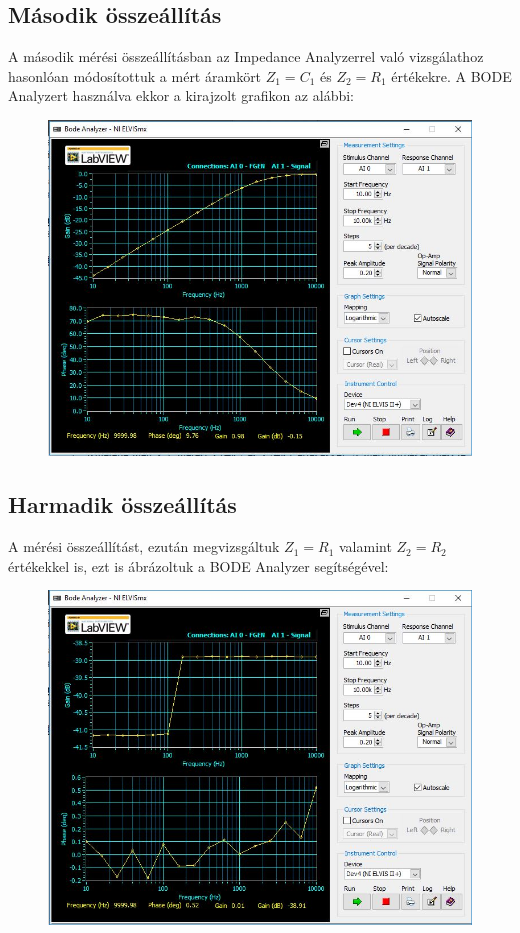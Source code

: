\documentclass[10pt, conference,a4paper]{ITKproc}
\begin{document}
\subsection{Második összeállítás}
A második mérési összeállításban az Impedance Analyzerrel való vizsgálathoz hasonlóan módosítottuk a mért áramkört $Z_1 = C_1$ és $Z_2 = R_1$ értékekre. A BODE Analyzert használva ekkor a kirajzolt grafikon az alábbi:
\begin{figure}[h]
\includegraphics[scale=0.3]{bode_2}
\centering
\end{figure}

\subsection{Harmadik összeállítás}
A mérési összeállítást, ezután megvizsgáltuk $Z_1 = R_1$ valamint $Z_2 = R_2$ értékekkel is, ezt is ábrázoltuk a BODE Analyzer segítségével:
\begin{figure}[h]
\includegraphics[scale=0.3]{bode_3}
\centering
\end{figure}
\end{document}
